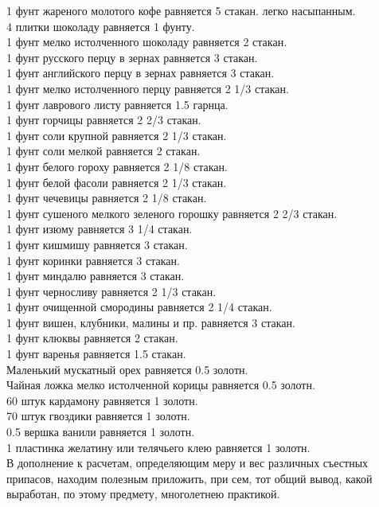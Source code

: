 1 фунт жареного молотого кофе равняется 5 стакан. легко насыпанным.\\
4 плитки шоколаду равняется 1 фунту.\\
1 фунт мелко истолченного шоколаду равняется 2 стакан.\\
1 фунт русского перцу в зернах равняется 3 стакан.\\
1 фунт английского перцу в зернах равняется 3 стакан.\\
1 фунт мелко истолченного перцу равняется 2 1/3 стакан.\\
1 фунт лаврового листу равняется 1.5 гарнца.\\
1 фунт горчицы равняется 2 2/3 стакан.\\
1 фунт соли крупной равняется 2 1/3 стакан.\\
1 фунт соли мелкой равняется 2 стакан.\\
1 фунт белого гороху равняется 2 1/8 стакан.\\
1 фунт белой фасоли равняется 2 1/3 стакан.\\
1 фунт чечевицы равняется 2 1/8 стакан.\\
1 фунт сушеного мелкого зеленого горошку равняется 2 2/3 стакан.\\
1 фунт изюму равняется 3 1/4 стакан.\\
1 фунт кишмишу равняется 3 стакан.\\
1 фунт коринки равняется 3 стакан.\\
1 фунт миндалю равняется 3 стакан.\\
1 фунт черносливу равняется 2 1/3 стакан.\\
1 фунт очищенной смородины равняется 2 1/4 стакан.\\
1 фунт вишен, клубники, малины и пр. равняется 3 стакан.\\
1 фунт клюквы равняется 2 стакан.\\
1 фунт варенья равняется 1.5 стакан.\\
Маленький мускатный орех равняется 0.5 золотн.\\
Чайная ложка мелко истолченной корицы равняется 0.5 золотн.\\
60 штук кардамону равняется 1 золотн.\\
70 штук гвоздики равняется 1 золотн.\\
0.5 вершка ванили равняется 1 золотн.\\
1 пластинка желатину или телячьего клею равняется 1 золотн.\\

В дополнение к расчетам, определяющим меру и вес различных съестных припасов, находим полезным приложить, при сем, тот общий вывод, какой выработан, по этому предмету, многолетнею практикой.

